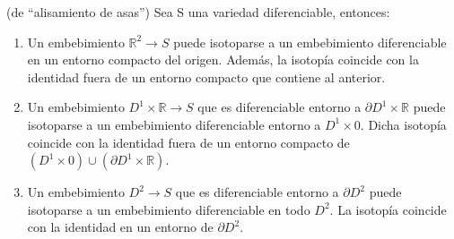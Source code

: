 

\begin{teorema} (de ``alisamiento de asas'')
	Sea S una variedad diferenciable, entonces:
	\begin{enumerate}
		\item Un embebimiento $\mathbb{R}^2 \rightarrow S$ puede isotoparse a un embebimiento diferenciable en un entorno compacto del origen. Además, la isotopía coincide con la identidad fuera de un entorno compacto que contiene al anterior.
		\item Un embebimiento $D^1\times\mathbb{R} \rightarrow S$ que es diferenciable entorno a $\partial D^1\times\mathbb{R}$ puede isotoparse a un embebimiento diferenciable entorno a $D^1\times 0$. Dicha isotopía coincide con la identidad fuera de un entorno compacto de $(D^1 \times 0) \cup (\partial D^1\times\mathbb{R})$.
		\item Un embebimiento $D^2 \rightarrow S$ que es diferenciable entorno a $\partial D^2$ puede isotoparse a un embebimiento diferenciable en todo $D^2$. La isotopía coincide con la identidad en un entorno de $\partial D^2$.
	\end{enumerate}
\end{teorema}

